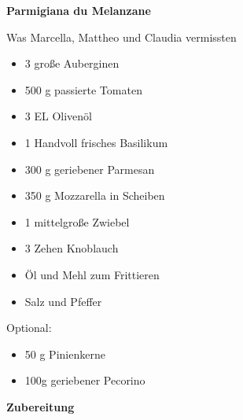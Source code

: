 


\parindent0pt	

\pagestyle{empty}


\textbf{{\LARGE Parmigiana du Melanzane}}%

\hrulefill

Was Marcella, Mattheo und Claudia vermissten
\vspace*{\fill}
\begin{multicols}{2}	


\begin{itemize}
\item 3 große Auberginen 
\item 500 g passierte Tomaten
\item 3 EL Olivenöl 
\item 1 Handvoll frisches Basilikum 
\item 300 g geriebener Parmesan 
\item 350 g Mozzarella in Scheiben
\item 1 mittelgroße Zwiebel 
\item 3 Zehen Knoblauch
\item Öl und Mehl zum Frittieren
\item Salz und Pfeffer
\end{itemize}
Optional:
\begin{itemize}
\item 50 g Pinienkerne
\item 100g geriebener Pecorino
\end{itemize}
\vfill									
\end{multicols}

\vspace{1cm}			%


\vfill
\newpage
\textbf{{\LARGE Zubereitung}}%

\hrulefill

